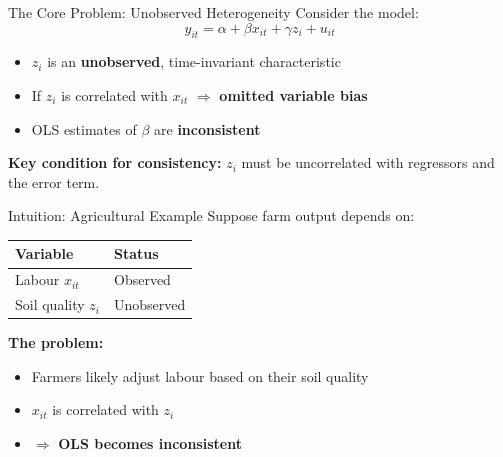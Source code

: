 \documentclass[aspectratio=169]{beamer}
\newenvironment{callout-warning}[1][Warning]{%
  \begin{tcolorbox}[colback=warnbg, colframe=warnframe,
    title={\textbf{#1}}, fonttitle=\small\bfseries,
    left=4pt, right=4pt, top=2pt, bottom=2pt]
}{\end{tcolorbox}}
\begin{document}
\begin{frame}{The Core Problem: Unobserved Heterogeneity}
  Consider the model:
  \[
    y_{it} = \alpha + \beta x_{it} + \gamma z_i + u_{it}
  \]
  \begin{itemize}
    \item $z_i$ is an \textbf{unobserved}, time-invariant characteristic
    \item If $z_i$ is correlated with $x_{it}$ $\Rightarrow$ \textbf{omitted variable bias}
    \item OLS estimates of $\beta$ are \textbf{inconsistent}
  \end{itemize}

  \vspace{0.5em}
  \begin{callout-warning}
    \textbf{Key condition for consistency:} $z_i$ must be uncorrelated with regressors and the error term.
  \end{callout-warning}
\end{frame}

\begin{frame}{Intuition: Agricultural Example}
  Suppose farm output depends on:

  \vspace{0.5em}
  \begin{center}
    \begin{tabular}{ll}
      \toprule
      \textbf{Variable} & \textbf{Status} \\
      \midrule
      Labour $x_{it}$ & Observed \\
      Soil quality $z_i$ & Unobserved \\
      \bottomrule
    \end{tabular}
  \end{center}

  \vspace{0.8em}
  \textbf{The problem:}
  \begin{itemize}
    \item Farmers likely adjust labour based on their soil quality
    \item $x_{it}$ is correlated with $z_i$
    \item $\Rightarrow$ \textbf{OLS becomes inconsistent}
  \end{itemize}
\end{frame}
\end{document}
